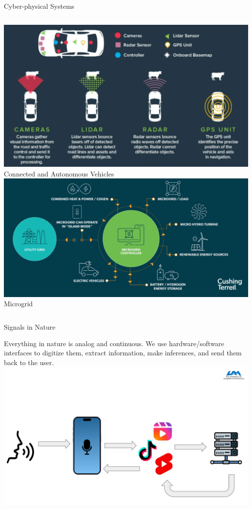 \documentclass[aspectratio=169,xcolor=dvipsnames,svgnames,x11names,fleqn]{beamer}
\begin{document}
\begin{frame}{Cyber-physical Systems}
\centering
    \begin{columns}
          \centering
          \includegraphics[width=0.99\linewidth]{figures/CPS1.png}
          Connected and Autonomous Vehicles
         \centering
          \includegraphics[width=0.99\linewidth]{figures/CSP2.png}
          Microgrid
    \end{columns}
\end{frame}

\begin{frame}{Signals in Nature}
    \begin{center}
        Everything in nature is analog and continuous. We use hardware/software interfaces to digitize them, extract information, make inferences, and send them back to the user.
        \includegraphics[width=0.95\linewidth, trim=0 0 0 4cm,clip]{figures/signals_comm.pdf}

    \end{center}
\end{frame}
\end{document}
